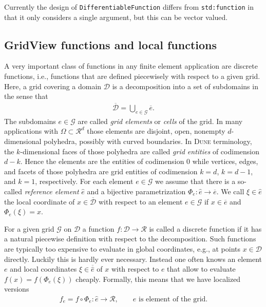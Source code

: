 \documentclass[11pt,
                 numbers=noenddot,
                 headings=normal,
                 DIV16, BCOR10mm]{scrartcl}
\newcommand{\cpp}{\lstinline}
\theoremstyle{remark}
\newcommand{\dune}{\textsc{Dune}\xspace}
\begin{document}
Currently the design of \cpp{DifferentiableFunction} differs from
\cpp{std:function} in that it only considers a single argument, but
this can be vector valued.



\subsection{GridView functions and local functions}

A very important class of functions in any finite element application are discrete functions, i.e., functions that
are defined piecewisely with respect to a given grid.
Here, a grid covering a domain $\mathcal{D}$
is a decomposition into a set of subdomains in the sense that
\begin{align*}
    \overline{\mathcal{D}} = \bigcup_{e \in \mathcal{G}} \overline{e}. %
\end{align*}
The subdomains $e \in \mathcal{G}$ are called \emph{grid elements} or \emph{cells} of the grid.
In many applications with $\Omega \subset \mathcal{R}^d$ those elements are
disjoint, open, nonempty $d$-dimensional polyhedra, possibly with curved boundaries. In \dune terminology, the $k$-dimensional faces of those polyhedra
are called \emph{grid entities} of codimension $d-k$. Hence the elements are the entities
of codimension $0$ while vertices, edges, and facets of those polyhedra are grid entities of codimension
$k=d$, $k=d-1$, and $k=1$, respectively.
For each element $e \in \mathcal{G}$ we assume that there is a so-called
\emph{reference element} $\hat{e}$ and a bijective parametrization $\Phi_e:\hat{e} \to \overline{e}$.
We call $\xi \in \hat{e}$ the local coordinate of $x \in \overline{\mathcal{D}}$ with respect to an
element $e \in \mathcal{G}$ if $x \in \overline{e}$ and $\Phi_e(\xi) = x$.

For a given grid $\mathcal{G}$ on $\mathcal{D}$ a function $f:\mathcal{D} \to \mathcal{R}$
is called a discrete function if it has a natural piecewise definition with respect to the decomposition.
Such functions are typically too expensive to evaluate in
global coordinates, e.g., at points $x \in \mathcal{D}$ directly.
Luckily this is hardly ever necessary.
Instead one often knows an element $e$ and local coordinates
$\xi \in \overline{\hat{e}}$ of $x$ with respect to $e$
that allow to evaluate $f(x) = f(\Phi_e(\xi))$ cheaply.
Formally, this means that we have localized versions
\begin{align*}
    f_e = f \circ \Phi_e : \hat{e} \to \mathcal{R},
    \qquad
    \text{$e$ is element of the grid}.
\end{align*}
\end{document}
